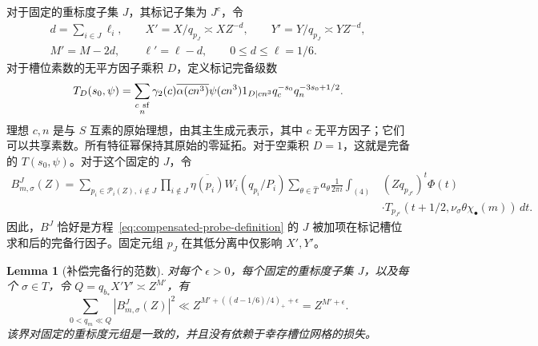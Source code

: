 \documentclass[11pt,a4paper]{article}
\numberwithin{equation}{section}
\numberwithin{figure}{section}
\newtheorem{lemma}[theorem]{Lemma}
\theoremstyle{definition}
\theoremstyle{remark}
\begin{document}
对于固定的重标度子集 $J$，其标记子集为 $J^c$，令
\begin{equation}
 \begin{gathered}
 d=\sum_{i\in J}\ell_i,\qquad
 X'=X/q_{p_J}\asymp XZ^{-d},\qquad
 Y'=Y/q_{p_J}\asymp YZ^{-d},\\
 M'=M-2d,\qquad \ell'=\ell-d,\qquad 0\le d\le\ell=1/6.
 \end{gathered}
 \label{old-eq:5.2}
\end{equation}
对于槽位素数的无平方因子乘积 $D$，定义标记完备级数
\[
 T_D(s_0,\psi)=\sum_{\substack{c\ {\rm sf}\\n}}
 \gamma_2(c)\overline{\alpha(cn^3)}\psi(cn^3)
 1_{D\mid cn^3}q_c^{-s_0}q_n^{-3s_0+1/2}.
\]
理想 $c,n$ 是与 $S$ 互素的原始理想，由其主生成元表示，其中 $c$ 无平方因子；它们可以共享素数。所有特征幂保持其原始的零延拓。对于空乘积 $D=1$，这就是完备的 $T(s_0,\psi)$。对于这个固定的 $J$，令
\[
\begin{split}
 B^J_{m,\sigma}(Z)=
 \sum_{p_i\in\mathcal P_i(Z),\ i\notin J}
 \prod_{i\notin J}\overline{\eta(p_i)}W_i(q_{p_i}/P_i)
 \sum_{\theta\in\widehat T}a_\theta\frac1{2\pi i}
 \int_{(4)} &(Zq_{p_{J^c}})^t\Phi(t)\\
 &\cdot T_{p_{J^c}}(t+1/2,
             \nu_\sigma\theta\chi_\bullet(m))\,dt.
\end{split}
\]
因此，$B^J$ 恰好是方程~\eqref{eq:compensated-probe-definition} 的 $J$ 被加项在标记槽位求和后的完备行因子。固定元组 $p_J$ 在其低分离中仅影响 $X',Y'$。

\begin{lemma}[补偿完备行的范数]\label{lem:probe-row-norm}
对每个 $\epsilon>0$，每个固定的重标度子集 $J$，以及每个 $\sigma\in T$，令 $Q=q_{b_*}X'Y'\asymp Z^{M'}$，有
\begin{equation}
 \sum_{0<q_m\ll Q}|B^J_{m,\sigma}(Z)|^2
       \ll Z^{M'+((d-1/6)/4)_++\epsilon}
       =Z^{M'+\epsilon}.
 \label{old-eq:5.4}
\end{equation}
该界对固定的重标度元组是一致的，并且没有依赖于幸存槽位网格的损失。
\end{lemma}
\end{document}
